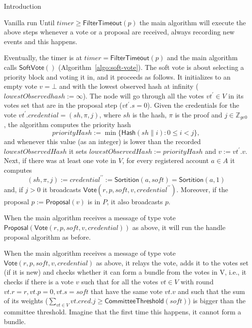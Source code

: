 \documentclass[10pt,a4paper]{article}
\begin{document}
\begin{section}{Introduction}
\begin{subsection}{Vanilla run}
Until $timer\ge \mathsf{FilterTimeout}(p)$ the main algorithm will execute the above steps
whenever a vote or a proposal are received, always recording new events and this happens.

Eventually, the timer is at $timer=\mathsf{FilterTimeout}(p)$ and the main algorithm calls 
$\mathsf{SoftVote()}$ (Algorithm~\ref{algo:soft-vote}).
The soft vote is about selecting a priority block and voting it in, and it proceeds as follows.
It initializes to an empty vote $v=\bot$ and with the lowest observed hash at infinity ($lowestObservedhash:=\infty$).
The node will go through all the votes $vt^\prime\in V$ in its votes set that are in the
proposal step ($vt^\prime.s=0$).
Given the credentials for the vote $vt^\prime.credential=(sh,\pi, j)$, where $sh$ is the hash,
$\pi$ is the proof and $j\in\mathbb{Z}_{ge 0}$, the algorithm computes the priority hash
$$
priorityHash:=\min\{\mathsf{Hash}(sh\| i): 0\le i<j\},
$$
and whenever this value (as an integer) is lower than the recorded 
$lowestObservedHash$ it sets 
$lowestObservedHash:=priorityHash$ and $v:=vt^\prime.v$.
Next, if there was at least one vote in $V$, for every registered account $a\in A$
it computes 
$$
(sh,\pi,j):=credential^{\prime\prime}:=\mathsf{Sortition}(a,soft)=\mathsf{Sortition}(a,1)
$$
and, if $j>0$ it broadcasts $\mathsf{Vote}(r,p,soft,v,credential^{\prime\prime})$.
Moreover, if the proposal $p:=\mathsf{Proposal}(v)$ is in $P$, it also broadcasts $p$.

When the main algorithm receives a message of type vote 
$\mathsf{Proposal}(\mathsf{Vote}(r,p,soft,v,credential))$ as above, it will
run the handle proposal algorithm as before.

When the main algorithm receives a message of type vote 
$\mathsf{Vote}(r,p,soft,v,credential)$ as above, it relays the vote, adds it to the
votes set (if it is new) and checks whether it can form a bundle from the 
votes in V, i.e., it checks if there is a vote $v$ such that for all the votes 
$vt\in V$ with round $vt.r=r, vt.p=0, vt.s=soft$ that have the same vote $vt.v$ 
and such that the sum of its weights ($\sum_{vt\in V} vt.cred.j\ge \mathsf{CommitteeThreshold}(soft)$) 
is bigger than the committee threshold. 
Imagine that the first time this happens, it cannot form a bundle. 


\end{subsection}
\end{section}
\end{document}

